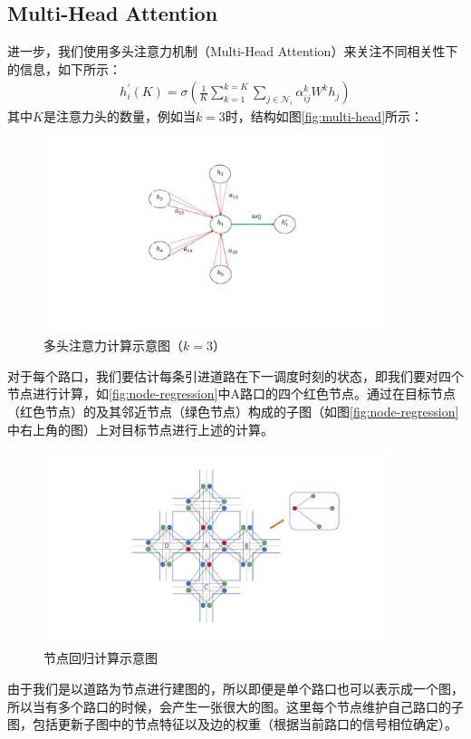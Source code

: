 \subsection{Multi-Head Attention}
进一步，我们使用多头注意力机制（Multi-Head Attention）来关注不同相关性下的信息，如下所示：
\begin{align}
  h_{i}^{\prime}(K)=\sigma\left( \frac{1}{K} \sum_{k=1}^{k=K} \sum_{j \in \mathcal{N}_{i}} \alpha_{i j}^{k} W^{k} h_{j}\right)
\end{align}
其中$K$是注意力头的数量，例如当$k = 3$时，结构如图\autoref{fig:multi-head}所示：
\begin{figure}[htb]
  \includegraphics[width=0.9\textwidth]{fig/multi-head.pdf}
  \caption{多头注意力计算示意图（$k=3$）}
  \label{fig:multi-head}
\end{figure}

对于每个路口，我们要估计每条引进道路在下一调度时刻的状态，即我们要对四个节点进行计算，如\autoref{fig:node-regression}中A路口的四个红色节点。通过在目标节点（红色节点）的及其邻近节点（绿色节点）构成的子图（如图\autoref{fig:node-regression}中右上角的图）上对目标节点进行上述的计算。
\begin{figure}[htb]
  \includegraphics[width=0.9\textwidth]{fig/node-regression.pdf}
  \caption{节点回归计算示意图}
  \label{fig:node-regression}
\end{figure}
由于我们是以道路为节点进行建图的，所以即便是单个路口也可以表示成一个图，所以当有多个路口的时候，会产生一张很大的图。这里每个节点维护自己路口的子图，包括更新子图中的节点特征以及边的权重（根据当前路口的信号相位确定）。

